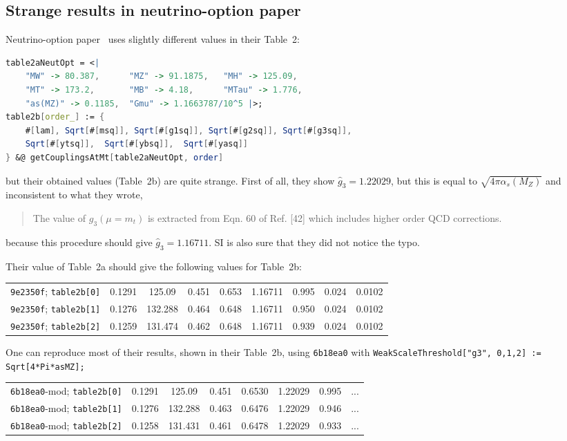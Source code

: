 \documentclass[a4paper,11pt]{scrartcl}
\numberwithin{equation}{section}
\newcommand{\rev}[1]{{\color{magenta}\texttt{#1}}}
\begin{document}
\subsection{Strange results in neutrino-option paper}
Neutrino-option paper~\cite{Brivio:2018rzm} uses slightly different values in their Table~2:
\begin{lstlisting}[language=Mathematica]
table2aNeutOpt = <|
    "MW" -> 80.387,      "MZ" -> 91.1875,   "MH" -> 125.09,
    "MT" -> 173.2,       "MB" -> 4.18,      "MTau" -> 1.776,
    "as(MZ)" -> 0.1185,  "Gmu" -> 1.1663787/10^5 |>;
table2b[order_] := {
    #[lam], Sqrt[#[msq]], Sqrt[#[g1sq]], Sqrt[#[g2sq]], Sqrt[#[g3sq]],
    Sqrt[#[ytsq]],  Sqrt[#[ybsq]],  Sqrt[#[yasq]]
} &@ getCouplingsAtMt[table2aNeutOpt, order]
\end{lstlisting}
but their obtained values (Table~2b) are quite strange.
First of all, they show $\hat g_3=1.22029$, but this is equal to $\sqrt{4\pi\alpha_s(M_Z)}$ and inconsistent to what they wrote,
\begin{quote}
The value of $g_3(\mu = m_t)$ is extracted from Eqn. 60 of Ref. [42] which includes higher order QCD corrections.
\end{quote}
because this procedure should give $\hat g_3=1.16711$.
SI is also sure that they did not notice the typo.

Their value of Table~2a should give the following values for Table~2b:
\begin{table}[h]\centering\small
 \begin{tabular}{c|cccccccc}
 \rev{9e2350f}; \texttt{table2b[0]}
& 0.1291 & 125.09 & 0.451 & 0.653 & 1.16711 & 0.995 & 0.024 & 0.0102\\
 \rev{9e2350f}; \texttt{table2b[1]}
& 0.1276 & 132.288 & 0.464 & 0.648 & 1.16711 & 0.950 & 0.024 & 0.0102\\
 \rev{9e2350f}; \texttt{table2b[2]}
& 0.1259 & 131.474 & 0.462 & 0.648 & 1.16711 & 0.939 & 0.024 & 0.0102\\
 \end{tabular}
\end{table}

One can reproduce most of their results, shown in their Table~2b, using \rev{6b18ea0} with \texttt{WeakScaleThreshold["g3", {0,1,2}] := Sqrt[4*Pi*asMZ];}

\begin{table}[h]\centering\small
 \begin{tabular}{c|ccccccc}
 \rev{6b18ea0}-mod; \texttt{table2b[0]}
&0.1291 & 125.09  & 0.451 & 0.6530 & 1.22029 & 0.995 & ...\\
 \rev{6b18ea0}-mod; \texttt{table2b[1]}
&0.1276 & 132.288 & 0.463 & 0.6476 & 1.22029 & 0.946 & ...\\
 \rev{6b18ea0}-mod; \texttt{table2b[2]}
&0.1258 & 131.431 & 0.461 & 0.6478 & 1.22029 & 0.933 & ...\\
 \end{tabular}
\end{table}
\end{document}
